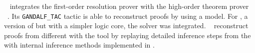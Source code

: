 \documentclass[../main.tex]{subfiles}
\begin{document}
\citeauthor{Hurd1999}~\cite{Hurd1999} integrates the first-order resolution prover
 with the high-order
theorem prover ~\cite{norrish2007hol}.
Its \verb!GANDALF_TAC! tactic is able to reconstruct  proofs
by using a  model. For , a version of
 but with a simpler logic core, the \SMT solver 
was integrated. \citeauthor{kaliszyk2013}~\cite{kaliszyk2013}
reconstruct proofs from different \ATPs with the  tool by
replaying detailed inference steps from the \ATPs with internal
inference methods implemented in .
\end{document}
